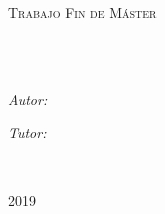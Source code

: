 \documentclass[
11pt, %
spanish,
singlespacing, %
headsepline, %
]{MastersDoctoralThesis} %
\author{\textsc{José María \\ Sánchez Salas}} %
\begin{document}
\nocite{*} %

\frontmatter %

\pagestyle{plain} %


\begin{titlepage}
\begin{center}

\vspace*{.06\textheight}
{\scshape\LARGE \univname\par}\vspace{1.5cm} %
\vspace{10mm}%
{\scshape\huge \degreename\par} \vspace{1.5cm} %
\textsc{\LARGE Trabajo Fin de Máster}\\[0.5cm] %

\vspace{10mm}
\HRule \\[0.4cm] %
{\huge \bfseries \ttitle\par}\vspace{0.4cm} %
\HRule \\[2.5cm] %
 
\begin{minipage}[t]{0.4\textwidth}
\begin{flushleft} \large
\emph{Autor:}\\
\authorname %
\end{flushleft}
\end{minipage}
\begin{minipage}[t]{0.4\textwidth}
\begin{flushright} \large
\emph{Tutor:} \\
\supname %
\end{flushright}
\end{minipage}\\[1.5cm]
 
\vfill

{\large \textsc{2019}}\\[4cm] %
 
\vfill
\end{center}
\end{titlepage}
\end{document}
